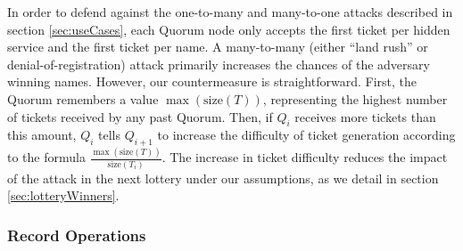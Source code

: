 \documentclass[USenglish,oneside,twocolumn]{article}
\begin{document}
In order to defend against the one-to-many and many-to-one attacks described in section \ref{sec:useCases}, each Quorum node only accepts the first ticket per hidden service and the first ticket per name. A many-to-many (either ``land rush'' or denial-of-registration) attack primarily increases the chances of the adversary winning names. However, our countermeasure is straightforward. First, the Quorum remembers a value $ \max(\mathrm{size}(T)) $, representing the highest number of tickets received by any past Quorum. Then, if $ Q_{i} $ receives more tickets than this amount, $ Q_{i} $ tells $ Q_{i + 1} $ to increase the difficulty of ticket generation according to the formula $ \frac{\max(\mathrm{size}(T))}{\mathrm{size}(T_{i})} $. The increase in ticket difficulty reduces the impact of the attack in the next lottery under our assumptions, as we detail in section \ref{sec:lotteryWinners}.

%
%





\subsubsection{Record Operations} %
\label{sec:recordOps}
\end{document}

